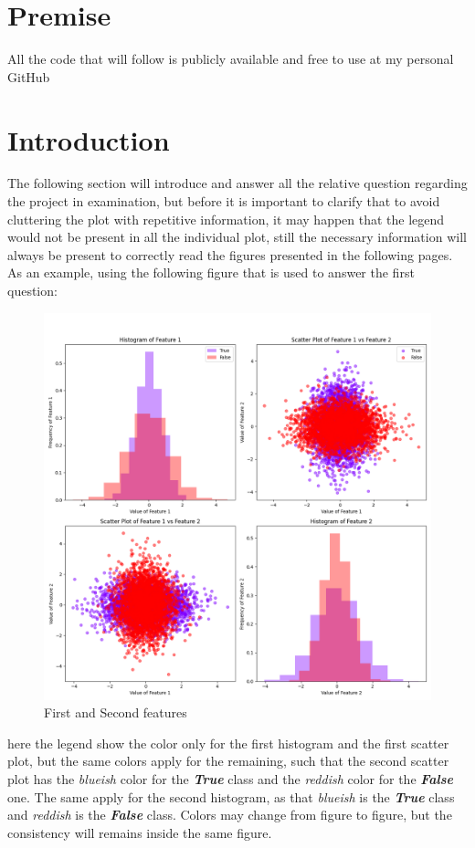 \documentclass[a4paper, 12pt, english]{article}
\begin{document}
    \newpage
    \tableofcontents

    \newpage
    \section*{Premise}
    All the code that will follow is publicly available and free to use at my personal GitHub \cite{nickrepository}


    \section*{Introduction}
    The following section will introduce and answer all the relative question regarding the project in examination, but before it is important to clarify that to avoid cluttering the plot with repetitive information, it may happen that the legend would not be present in all the individual plot, still the necessary information will always be present to correctly read the figures presented in the following pages.
    As an example, using the following figure that is used to answer the first question:
    \begin{figure}[H]
        \centering
        \includegraphics[width=0.7\linewidth]{img/projects/project1/1-2.png}
        \caption{First and Second features}
        \label{fig:project1:1-2}
    \end{figure}
    here the legend show the color only for the first histogram and the first scatter plot, but the same colors apply for the remaining, such that the second scatter plot has the \textit{blueish} color for the \textbf{\textit{True}} class and the \textit{reddish} color for the \textbf{\textit{False}} one. The same apply for the second histogram, as that \textit{blueish} is the \textbf{\textit{True}} class and \textit{reddish} is the \textbf{\textit{False}} class. Colors may change from figure to figure, but the consistency will remains inside the same figure.
\end{document}
